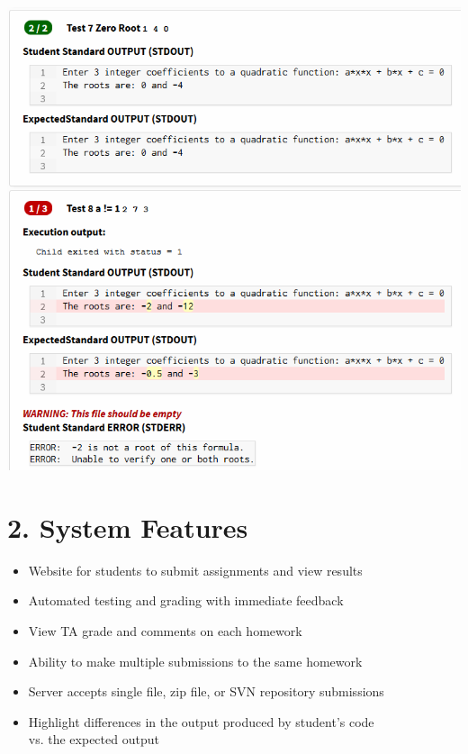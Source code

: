\documentclass[thesis]{hmcposter}
\begin{document}
\begin{poster}
\begin{center}
    \includegraphics[width=12in]{PartialCredit}
\end{center}




\columnbreak

\section{2. System Features}%


\begin{itemize}
    \item Website for students to submit assignments and view results
    \item Automated testing and grading with immediate feedback
    \item View TA grade and comments on each homework
    \item Ability to make multiple submissions to the same homework
    \item Server accepts single file, zip file, or SVN repository submissions
    \item Highlight differences in the output produced by student's code \\ vs. the expected output
\end{itemize}


\end{poster}
\end{document}
